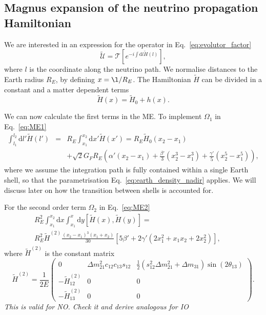 \documentclass{article}
\newcommand{\de}[0]{\text{d}}
\begin{document}
\subsection{Magnus expansion of the neutrino propagation Hamiltonian}
We are interested in an expression for the operator in Eq.~\ref{eq:evolutor_factor}
\begin{equation}
	\tilde{\mathcal{U}} = \mathcal{T} \left[ e^{- i \int \de l \tilde{H}(l)} \right],
\end{equation}
where $l$ is the coordinate along the neutrino path. We normalise distances to the Earth radius $R_E$, by defining $x = \l/R_E$. The Hamiltonian $\tilde{H}$ can be divided in a constant and a matter dependent terms
\begin{equation}
	\tilde{H}(x) = \tilde{H}_0 + h(x).
\end{equation}

We can now calculate the first terms in the ME. To implement $\Omega_1$ in Eq.~\ref{eq:ME1}
\begin{eqnarray}
	\int_{l_1}^{l_2} \de l' \tilde{H}(l') &=& R_E \int_{x_1}^{x_2} \de x' \tilde{H}(x') = R_E \tilde{H}_0 \left(x_2 - x_1 \right)\\
	&& + \sqrt{2} G_F R_E \left( \alpha' \left( x_2 - x_1 \right) + \frac{\beta'}{3} \left(x_2^3 - x_1^3\right) + \frac{\gamma'}{5} \left(x_2^5 - x_1^5\right) \right),
\end{eqnarray}
where we assume the integration path is fully contained within a single Earth shell, so that the parametrisation Eq.~\ref{eq:earth_density_nadir} applies. We will discuss later on how the transition between shells is accounted for.

For the second order term $\Omega_2$ in Eq.~\ref{eq:ME2}
\begin{eqnarray}
	R_E^2 \int_{x_1}^{x_2} \de x \int_{x_1}^x \de y \left[ \tilde{H}(x), \tilde{H}(y) \right] = && \\
	 R_E^2 \tilde{H}^{(2)} \frac{\left(x_2 - x_1\right)^3 \left(x_1 + x_2 \right)}{30}\left[ 5 \beta' + 2 \gamma' \left( 2 x_1^2 + x_1 x_2 + 2x_2^2 \right) \right],
\end{eqnarray}
where $\tilde{H}^{(2)}$ is the constant matrix
\begin{equation}
	\tilde{H}^{(2)} = \frac{1}{2E} \left( \begin{array}{ccc}
 	0 & \Delta m_{21}^2 c_{12} c_{13} s_{12} & \frac{1}{2} \left(s_{12}^2 \Delta m_{21}^2 + \Delta m_{31} \right) \sin(2\theta_{13}) \\
 	- \tilde{H}^{(2)}_{12} & 0 & 0 \\
 	- \tilde{H}^{(2)}_{13} & 0 & 0
 \end{array} \right).
\end{equation}
\emph{This is valid for NO. Check it and derive analogous for IO}



\end{document}

